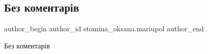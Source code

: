  
 
 
 
 

\subsection{Без коментарів}
\label{sec:03_06_2023.fb.stomina_oksana.mariupol.1.bez_komentariv}

\ifcmt
 author_begin
   author_id stomina_oksana.mariupol
 author_end
\fi

Без коментарів
